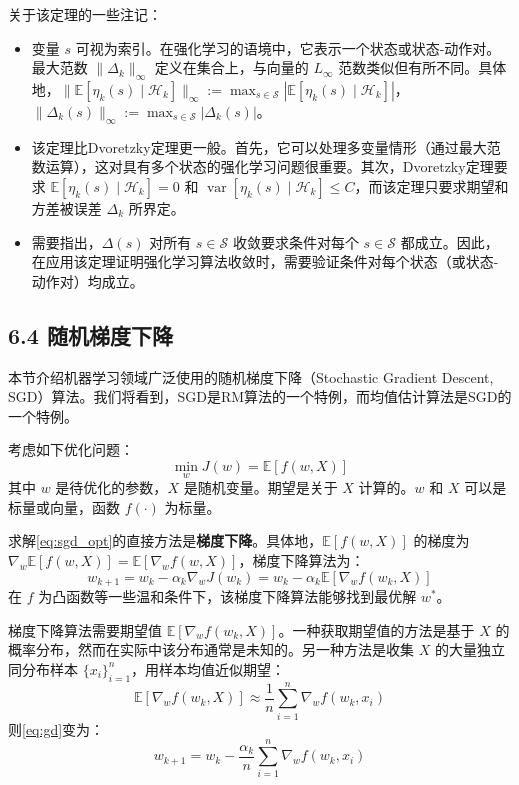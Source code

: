 \documentclass[UTF8]{article}
\begin{document}
关于该定理的一些注记：
\begin{itemize}
    \item 变量 $s$ 可视为索引。在强化学习的语境中，它表示一个状态或状态-动作对。最大范数 $\|\Delta_k\|_\infty$ 定义在集合上，与向量的 $L_\infty$ 范数类似但有所不同。具体地，$\|\mathbb{E}[\eta_k(s) \mid \mathcal{H}_k]\|_\infty := \max_{s \in \mathcal{S}} |\mathbb{E}[\eta_k(s) \mid \mathcal{H}_k]|$，$\|\Delta_k(s)\|_\infty := \max_{s \in \mathcal{S}} |\Delta_k(s)|$。
    \item 该定理比Dvoretzky定理更一般。首先，它可以处理多变量情形（通过最大范数运算），这对具有多个状态的强化学习问题很重要。其次，Dvoretzky定理要求 $\mathbb{E}[\eta_k(s) \mid \mathcal{H}_k] = 0$ 和 $\operatorname{var}[\eta_k(s) \mid \mathcal{H}_k] \leq C$，而该定理只要求期望和方差被误差 $\Delta_k$ 所界定。
    \item 需要指出，$\Delta(s)$ 对所有 $s \in \mathcal{S}$ 收敛要求条件对每个 $s \in \mathcal{S}$ 都成立。因此，在应用该定理证明强化学习算法收敛时，需要验证条件对每个状态（或状态-动作对）均成立。
\end{itemize}

\subsection*{6.4 随机梯度下降}

本节介绍机器学习领域广泛使用的随机梯度下降（Stochastic Gradient Descent, SGD）算法。我们将看到，SGD是RM算法的一个特例，而均值估计算法是SGD的一个特例。

考虑如下优化问题：
\begin{equation}
\label{eq:sgd_opt}
\min_w J(w) = \mathbb{E}[f(w, X)]
\end{equation}
其中 $w$ 是待优化的参数，$X$ 是随机变量。期望是关于 $X$ 计算的。$w$ 和 $X$ 可以是标量或向量，函数 $f(\cdot)$ 为标量。

求解\eqref{eq:sgd_opt}的直接方法是\textbf{梯度下降}。具体地，$\mathbb{E}[f(w, X)]$ 的梯度为 $\nabla_w \mathbb{E}[f(w, X)] = \mathbb{E}[\nabla_w f(w, X)]$，梯度下降算法为：
\begin{equation}
\label{eq:gd}
w_{k+1} = w_k - \alpha_k \nabla_w J(w_k) = w_k - \alpha_k \mathbb{E}[\nabla_w f(w_k, X)]
\end{equation}
在 $f$ 为凸函数等一些温和条件下，该梯度下降算法能够找到最优解 $w^*$。

梯度下降算法需要期望值 $\mathbb{E}[\nabla_w f(w_k, X)]$。一种获取期望值的方法是基于 $X$ 的概率分布，然而在实际中该分布通常是未知的。另一种方法是收集 $X$ 的大量独立同分布样本 $\{x_i\}_{i=1}^{n}$，用样本均值近似期望：
\[
\mathbb{E}[\nabla_w f(w_k, X)] \approx \frac{1}{n}\sum_{i=1}^{n} \nabla_w f(w_k, x_i)
\]
则\eqref{eq:gd}变为：
\begin{equation}
\label{eq:batch_gd}
w_{k+1} = w_k - \frac{\alpha_k}{n}\sum_{i=1}^{n} \nabla_w f(w_k, x_i)
\end{equation}
\end{document}

